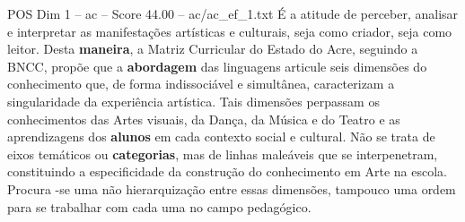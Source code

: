 \begin{textsample}{POS Dim 1 – ac – Score 44.00 – ac/ac\_ef\_1.txt}
É a atitude de perceber, analisar e interpretar as manifestações artísticas e culturais, seja como criador, seja como leitor.
Desta \textbf{maneira}, a Matriz Curricular do Estado do Acre, seguindo a BNCC, propõe que a \textbf{abordagem} das linguagens articule seis dimensões do conhecimento que, de forma indissociável e simultânea, caracterizam a singularidade da experiência artística.
Tais dimensões perpassam os conhecimentos das Artes visuais, da Dança, da Música e do Teatro e as aprendizagens dos \textbf{alunos} em cada contexto social e cultural.
Não se trata de eixos temáticos ou \textbf{categorias}, mas de linhas maleáveis que se interpenetram, constituindo a especificidade da construção do conhecimento em Arte na escola.
Procura -se uma não hierarquização entre essas dimensões, tampouco uma ordem para se trabalhar com cada uma no campo pedagógico.

\end{textsample}
